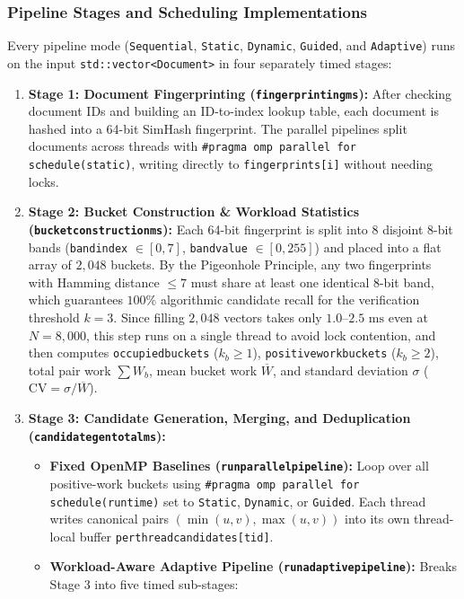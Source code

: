 \documentclass[11pt,a4paper]{article}
\renewcommand{\_}{\textunderscore\allowbreak}
\begin{document}
\subsubsection*{Pipeline Stages and Scheduling Implementations}
Every pipeline mode (\texttt{Sequential}, \texttt{Static}, \texttt{Dynamic}, \texttt{Guided}, and \texttt{Adaptive}) runs on the input \texttt{std::vector<Document>} in four separately timed stages:
\begin{enumerate}
    \item \textbf{Stage 1: Document Fingerprinting (\texttt{fingerprinting\_ms}):} After checking document IDs and building an ID-to-index lookup table, each document is hashed into a 64-bit SimHash fingerprint. The parallel pipelines split documents across threads with \texttt{\#pragma omp parallel for schedule(static)}, writing directly to \texttt{fingerprints[i]} without needing locks.
    \item \textbf{Stage 2: Bucket Construction \& Workload Statistics (\texttt{bucket\_construction\_ms}):} Each 64-bit fingerprint is split into 8 disjoint 8-bit bands (\texttt{band\_index} $\in [0, 7]$, \texttt{band\_value} $\in [0, 255]$) and placed into a flat array of $2,048$ buckets. By the Pigeonhole Principle, any two fingerprints with Hamming distance $\le 7$ must share at least one identical 8-bit band, which guarantees $100\%$ algorithmic candidate recall for the verification threshold $k = 3$. Since filling $2,048$ vectors takes only $1.0\text{--}2.5\text{ ms}$ even at $N = 8,000$, this step runs on a single thread to avoid lock contention, and then computes \texttt{occupied\_buckets} ($k_b \ge 1$), \texttt{positive\_work\_buckets} ($k_b \ge 2$), total pair work $\sum W_b$, mean bucket work $\overline{W}$, and standard deviation $\sigma$ ($\text{CV} = \sigma / \overline{W}$).
    \item \textbf{Stage 3: Candidate Generation, Merging, and Deduplication (\texttt{candidate\_gen\_total\_ms}):}
    \begin{itemize}
        \item \textbf{Fixed OpenMP Baselines (\texttt{run\_parallel\_pipeline}):} Loop over all positive-work buckets using \texttt{\#pragma omp parallel for schedule(runtime)} set to \texttt{Static}, \texttt{Dynamic}, or \texttt{Guided}. Each thread writes canonical pairs $(\min(u, v), \max(u, v))$ into its own thread-local buffer \texttt{per\_thread\_candidates[tid]}.
        \item \textbf{Workload-Aware Adaptive Pipeline (\texttt{run\_adaptive\_pipeline}):} Breaks Stage 3 into five timed sub-stages:

\end{itemize}
\end{enumerate}
\end{document}
